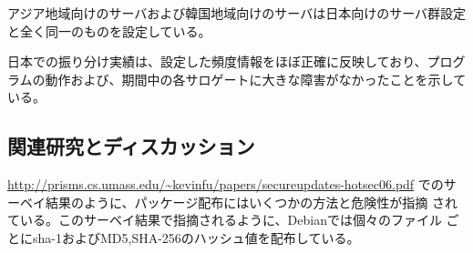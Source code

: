 \documentclass[mingoth,a4paper]{jsarticle}
\begin{document}

アジア地域向けのサーバおよび韓国地域向けのサーバは日本向けのサーバ群設定
と全く同一のものを設定している。


日本での振り分け実績は、設定した頻度情報をほぼ正確に反映しており、プログ
ラムの動作および、期間中の各サロゲートに大きな障害がなかったことを示して
いる。

\subsection{関連研究とディスカッション}

\url{http://prisms.cs.umass.edu/~kevinfu/papers/secureupdates-hotsec06.pdf}
でのサーベイ結果のように、パッケージ配布にはいくつかの方法と危険性が指摘
されている。このサーベイ結果で指摘されるように、Debianでは個々のファイル
ごとにsha-1およびMD5,SHA-256のハッシュ値を配布している。
\end{document}
